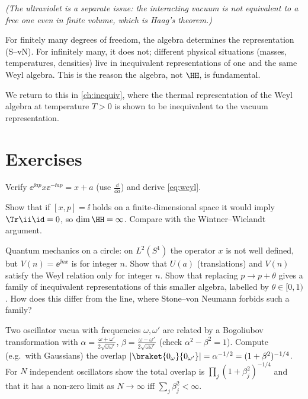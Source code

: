 \emph{(The ultraviolet is a separate issue: the interacting vacuum is not equivalent to a free one even in finite volume, which is Haag's theorem.)}

\begin{keyidea}
For finitely many degrees of freedom, the algebra determines the representation (S--vN). For infinitely many, it does not; different physical situations (masses, temperatures, densities) live in inequivalent representations of one and the same Weyl algebra. This is the reason the algebra, not $\HH$, is fundamental.
\end{keyidea}

We return to this in \cref{ch:inequiv}, where the thermal representation of the Weyl algebra at temperature $T>0$ is shown to be inequivalent to the vacuum representation.

\section*{Exercises}
\begin{exercise}
Verify $\ee^{\ii ap}x\ee^{-\ii ap}=x+a$ (use $\frac{\dd}{\dd a}$) and derive \eqref{eq:weyl}.
\end{exercise}
\begin{exercise}
Show that if $[x,p]=\ii$ holds on a finite-dimensional space it would imply $\Tr\ii\id=0$, so $\dim\HH=\infty$. Compare with the Wintner--Wielandt argument.
\end{exercise}
\begin{exercise}
Quantum mechanics on a circle: on $L^2(S^1)$ the operator $x$ is not well defined, but $V(n)=\ee^{\ii nx}$ is for integer $n$. Show that $U(a)$ (translations) and $V(n)$ satisfy the Weyl relation only for integer $n$. Show that replacing $p\to p+\theta$ gives a family of inequivalent representations of this smaller algebra, labelled by $\theta\in[0,1)$. How does this differ from the line, where Stone--von Neumann forbids such a family?
\end{exercise}
\begin{exercise}
Two oscillator vacua with frequencies $\omega,\omega'$ are related by a Bogoliubov transformation with $\alpha=\frac{\omega+\omega'}{2\sqrt{\omega\omega'}}$, $\beta=\frac{\omega-\omega'}{2\sqrt{\omega\omega'}}$ (check $\alpha^2-\beta^2=1$). Compute (e.g.\ with Gaussians) the overlap $|\braket{0_\omega}{0_{\omega'}}|=\alpha^{-1/2}=(1+\beta^2)^{-1/4}$. For $N$ independent oscillators show the total overlap is $\prod_j(1+\beta_j^2)^{-1/4}$ and that it has a non-zero limit as $N\to\infty$ iff $\sum_j\beta_j^2<\infty$.
\end{exercise}
